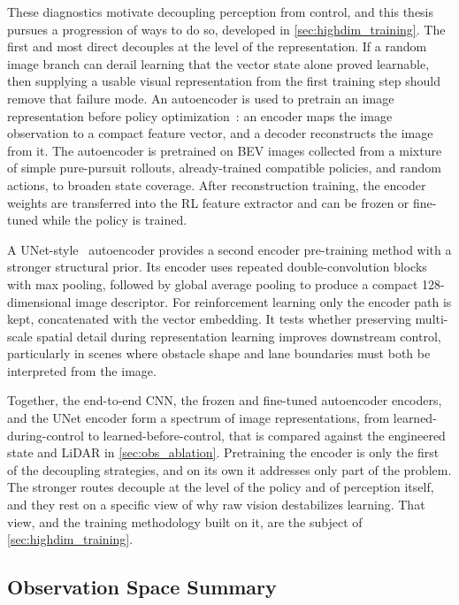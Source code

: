 These diagnostics motivate decoupling perception from control, and this thesis pursues a progression of ways to do so, developed in \cref{sec:highdim_training}. The first and most direct decouples at the level of the representation. If a random image branch can derail learning that the vector state alone proved learnable, then supplying a usable visual representation from the first training step should remove that failure mode. An autoencoder is used to pretrain an image representation before policy optimization~\cite{lange2010deep}: an encoder maps the image observation to a compact feature vector, and a decoder reconstructs the image from it. The autoencoder is pretrained on BEV images collected from a mixture of simple pure-pursuit rollouts, already-trained compatible policies, and random actions, to broaden state coverage. After reconstruction training, the encoder weights are transferred into the RL feature extractor and can be frozen or fine-tuned while the policy is trained.

A UNet-style~\cite{ronneberger2015unet} autoencoder provides a second encoder pre-training method with a stronger structural prior. Its encoder uses repeated double-convolution blocks with max pooling, followed by global average pooling to produce a compact 128-dimensional image descriptor. For reinforcement learning only the encoder path is kept, concatenated with the vector embedding. It tests whether preserving multi-scale spatial detail during representation learning improves downstream control, particularly in scenes where obstacle shape and lane boundaries must both be interpreted from the image.

Together, the end-to-end CNN, the frozen and fine-tuned autoencoder encoders, and the UNet encoder form a spectrum of image representations, from learned-during-control to learned-before-control, that is compared against the engineered state and LiDAR in \cref{sec:obs_ablation}. Pretraining the encoder is only the first of the decoupling strategies, and on its own it addresses only part of the problem. The stronger routes decouple at the level of the policy and of perception itself, and they rest on a specific view of why raw vision destabilizes learning. That view, and the training methodology built on it, are the subject of \cref{sec:highdim_training}.

\subsection{Observation Space Summary}

